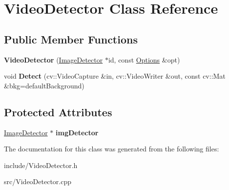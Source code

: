 \hypertarget{classVideoDetector}{}\section{Video\+Detector Class Reference}
\label{classVideoDetector}
\subsection*{Public Member Functions}
\begin{DoxyCompactItemize}
\item 
\hypertarget{classVideoDetector_ad8e95ff376d5efa37de2baea11da7757}{}{\bfseries Video\+Detector} (\hyperlink{classImageDetector}{Image\+Detector} $\ast$id, const \hyperlink{structOptions}{Options} \&opt)\label{classVideoDetector_ad8e95ff376d5efa37de2baea11da7757}

\item 
\hypertarget{classVideoDetector_a70bdba6b4f4afc31612ff822927c456d}{}void {\bfseries Detect} (cv\+::\+Video\+Capture \&in, cv\+::\+Video\+Writer \&out, const cv\+::\+Mat \&bkg=default\+Background)\label{classVideoDetector_a70bdba6b4f4afc31612ff822927c456d}

\end{DoxyCompactItemize}
\subsection*{Protected Attributes}
\begin{DoxyCompactItemize}
\item 
\hypertarget{classVideoDetector_aeae5949c4446a47bffcfebc7c1d9cc6e}{}\hyperlink{classImageDetector}{Image\+Detector} $\ast$ {\bfseries img\+Detector}\label{classVideoDetector_aeae5949c4446a47bffcfebc7c1d9cc6e}

\end{DoxyCompactItemize}


The documentation for this class was generated from the following files\+:\begin{DoxyCompactItemize}
\item 
include/Video\+Detector.\+h\item 
src/Video\+Detector.\+cpp\end{DoxyCompactItemize}
